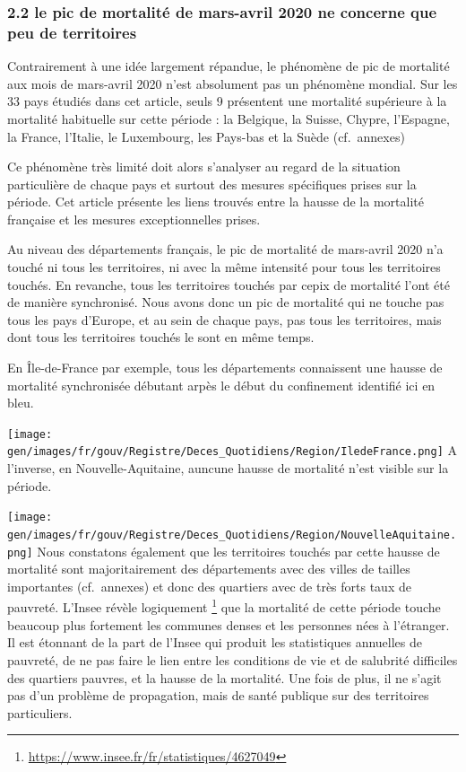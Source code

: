 \documentclass[
]{article}
\begin{document}
\hypertarget{le-pic-de-mortalituxe9-de-mars-avril-2020-ne-concerne-que-peu-de-territoires}{%
\subsubsection{2.2 le pic de mortalité de mars-avril 2020 ne concerne
que peu de
territoires}\label{le-pic-de-mortalituxe9-de-mars-avril-2020-ne-concerne-que-peu-de-territoires}}

Contrairement à une idée largement répandue, le phénomène de pic de
mortalité aux mois de mars-avril 2020 n'est absolument pas un phénomène
mondial. Sur les 33 pays étudiés dans cet article, seuls 9 présentent
une mortalité supérieure à la mortalité habituelle sur cette période :
la Belgique, la Suisse, Chypre, l'Espagne, la France, l'Italie, le
Luxembourg, les Pays-bas et la Suède (cf.~annexes)

Ce phénomène très limité doit alors s'analyser au regard de la situation
particulière de chaque pays et surtout des mesures spécifiques prises
sur la période. Cet article présente les liens trouvés entre la hausse
de la mortalité française et les mesures exceptionnelles prises.

Au niveau des départements français, le pic de mortalité de mars-avril
2020 n'a touché ni tous les territoires, ni avec la même intensité pour
tous les territoires touchés. En revanche, tous les territoires touchés
par cepix de mortalité l'ont été de manière synchronisé. Nous avons donc
un pic de mortalité qui ne touche pas tous les pays d'Europe, et au sein
de chaque pays, pas tous les territoires, mais dont tous les territoires
touchés le sont en même temps.

En Île-de-France par exemple, tous les départements connaissent une
hausse de mortalité synchronisée débutant arpès le début du confinement
identifié ici en bleu.

\texttt{[image: gen/images/fr/gouv/Registre/Deces\_Quotidiens/Region/IledeFrance.png]}
A l'inverse, en Nouvelle-Aquitaine, auncune hausse de mortalité n'est
visible sur la période.

\texttt{[image: gen/images/fr/gouv/Registre/Deces\_Quotidiens/Region/NouvelleAquitaine.png]}
Nous constatons également que les territoires touchés par cette hausse
de mortalité sont majoritairement des départements avec des villes de
tailles importantes (cf.~annexes) et donc des quartiers avec de très
forts taux de pauvreté. L'Insee révèle logiquement \footnote{\url{https://www.insee.fr/fr/statistiques/4627049}}
que la mortalité de cette période touche beaucoup plus fortement les
communes denses et les personnes nées à l'étranger. Il est étonnant de
la part de l'Insee qui produit les statistiques annuelles de pauvreté,
de ne pas faire le lien entre les conditions de vie et de salubrité
difficiles des quartiers pauvres, et la hausse de la mortalité. Une fois
de plus, il ne s'agit pas d'un problème de propagation, mais de santé
publique sur des territoires particuliers.
\end{document}
